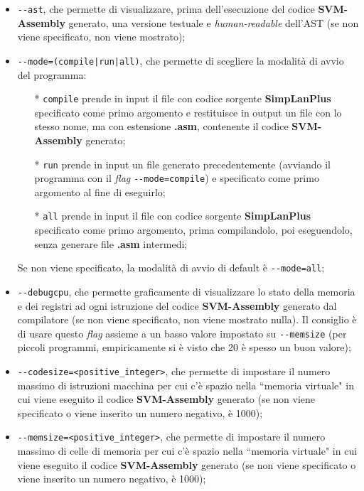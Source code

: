 \documentclass[../report.tex]{subfiles}
\begin{document}
\begin{itemize}
    \item \verb|--ast|, che permette di visualizzare, prima dell'esecuzione del codice \textbf{SVM-Assembly} generato, una versione testuale e \textit{human-readable} dell'AST (se non viene specificato, non viene mostrato);
    \item \verb/--mode=(compile|run|all)/, che permette di scegliere la modalità di avvio del programma:
    \begin{itemize}
        \item[*] \verb|compile| prende in input il file con codice sorgente \textbf{SimpLanPlus} specificato come primo argomento e restituisce in output un file con lo stesso nome, ma con estensione \textbf{.asm}, contenente il codice \textbf{SVM-Assembly} generato;
        \item[*] \verb|run| prende in input un file generato precedentemente (avviando il programma con il \textit{flag} \verb|--mode=compile|) e specificato come primo argomento al fine di eseguirlo;
        \item[*] \verb|all| prende in input il file con codice sorgente \textbf{SimpLanPlus} specificato come primo argomento, prima compilandolo, poi eseguendolo, senza generare file \textbf{.asm} intermedi;
    \end{itemize}
    Se non viene specificato, la modalità di avvio di default è \verb|--mode=all|;
    \item \verb|--debugcpu|, che permette graficamente di visualizzare lo stato della memoria e dei registri ad ogni istruzione del codice \textbf{SVM-Assembly} generato dal compilatore (se non viene specificato, non viene mostrato nulla). Il consiglio è di usare questo \textit{flag} assieme a un basso valore impostato su \verb|--memsize| (per piccoli programmi, empiricamente si è visto che 20 è spesso un buon valore);
    \item \verb|--codesize=<positive_integer>|, che permette di impostare il numero massimo di istruzioni macchina per cui c'è spazio nella ``memoria virtuale" in cui viene eseguito il codice \textbf{SVM-Assembly} generato (se non viene specificato o viene inserito un numero negativo, è 1000);
    \item \verb|--memsize=<positive_integer>|, che permette di impostare il numero massimo di celle di memoria per cui c'è spazio nella ``memoria virtuale" in cui viene eseguito il codice \textbf{SVM-Assembly} generato (se non viene specificato o viene inserito un numero negativo, è 1000);
\end{itemize}
\end{document}
